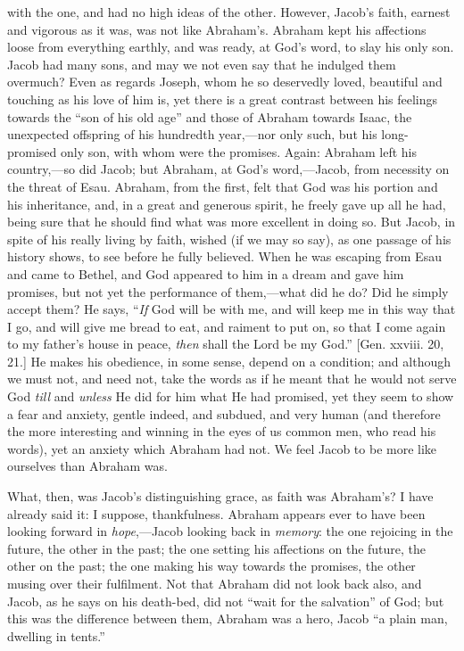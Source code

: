 with the one, and had no high ideas of the other. However, Jacob's
faith, earnest and vigorous as it was, was not like Abraham's. Abraham
kept his affections loose from everything earthly, and was ready, at
God's word, to slay his only son. Jacob had many sons, and may we not
even say that he indulged them overmuch? Even as regards Joseph, whom
he so deservedly loved, beautiful and touching as his love of him is,
yet there is a great contrast between his feelings towards the
``son of his old age'' and those of Abraham towards Isaac, the
unexpected offspring of his hundredth year,—nor only such, but his
long-promised only son, with whom were the promises. Again: Abraham
left his country,—so did Jacob; but Abraham, at God's word,—Jacob,
from necessity on the threat of Esau. Abraham, from the first, felt
that God was his portion and his inheritance, and, in a great and
generous spirit, he freely gave up all he had, being sure that he
should find what was more excellent in doing so. But Jacob, in spite
of his really living by faith, wished (if we may so say), as one
passage of his history shows, to see before he fully believed. When he
was escaping from Esau and came to Bethel, and God appeared to him in
a dream and gave him promises, but not yet the performance of them,—what
did he do? Did he simply accept them? He says, ``\emph{If} God
will be with me, and will keep me in this way that I go, and will give
me bread to eat, and raiment to put on, so that I come again to my
father's house in peace, \emph{then} shall the Lord be my God.''
[Gen. xxviii. 20, 21.] He makes his obedience, in some sense, depend
on a condition; and although we must not, and need not, take the words
as if he meant that he would not serve God \emph{till} and \emph{unless}
He did for him what He had promised, yet they seem to show a fear and
anxiety, gentle indeed, and subdued, and very human (and therefore the
more interesting and winning in the eyes of us common men, who read
his words), yet an anxiety which Abraham had not. We feel Jacob to be
more like ourselves than Abraham was.

What, then, was Jacob's distinguishing grace, as faith was
Abraham's? I have already said it: I suppose, thankfulness. Abraham
appears ever to have been looking forward in \emph{hope},—Jacob
looking back in \emph{memory}: the one rejoicing in the future, the
other in the past; the one setting his affections on the future, the
other on the past; the one making his way towards the promises, the
other musing over their fulfilment. Not that Abraham did not look back
also, and Jacob, as he says on his death-bed, did not ``wait for
the salvation'' of God; but this was the difference between them,
Abraham was a hero, Jacob ``a plain man, dwelling in tents.''

